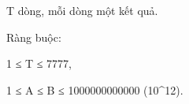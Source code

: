 T dòng, mỗi dòng một kết quả.  

   Ràng buộc:  

   1 ≤ T ≤ 7777,  

   1 ≤ A ≤ B ≤ 1000000000000 (10^12).